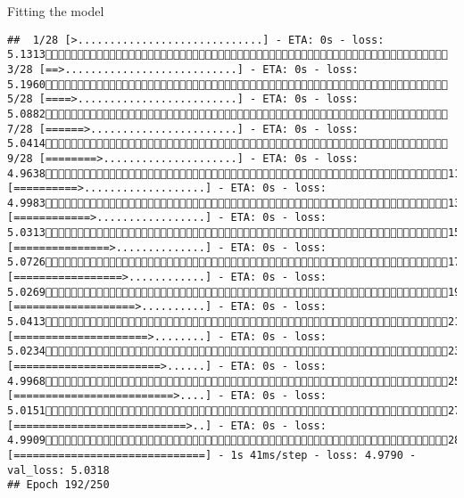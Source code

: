 \documentclass[
  ignorenonframetext,
]{beamer}
\begin{document}
\begin{frame}[fragile]{Fitting the model}
\begin{verbatim}
##  1/28 [>.............................] - ETA: 0s - loss: 5.1313 3/28 [==>...........................] - ETA: 0s - loss: 5.1960 5/28 [====>.........................] - ETA: 0s - loss: 5.0882 7/28 [======>.......................] - ETA: 0s - loss: 5.0414 9/28 [========>.....................] - ETA: 0s - loss: 4.963811/28 [==========>...................] - ETA: 0s - loss: 4.998313/28 [============>.................] - ETA: 0s - loss: 5.031315/28 [===============>..............] - ETA: 0s - loss: 5.072617/28 [=================>............] - ETA: 0s - loss: 5.026919/28 [===================>..........] - ETA: 0s - loss: 5.041321/28 [=====================>........] - ETA: 0s - loss: 5.023423/28 [=======================>......] - ETA: 0s - loss: 4.996825/28 [=========================>....] - ETA: 0s - loss: 5.015127/28 [===========================>..] - ETA: 0s - loss: 4.990928/28 [==============================] - 1s 41ms/step - loss: 4.9790 - val_loss: 5.0318
## Epoch 192/250

\end{verbatim}
\end{frame}
\end{document}
